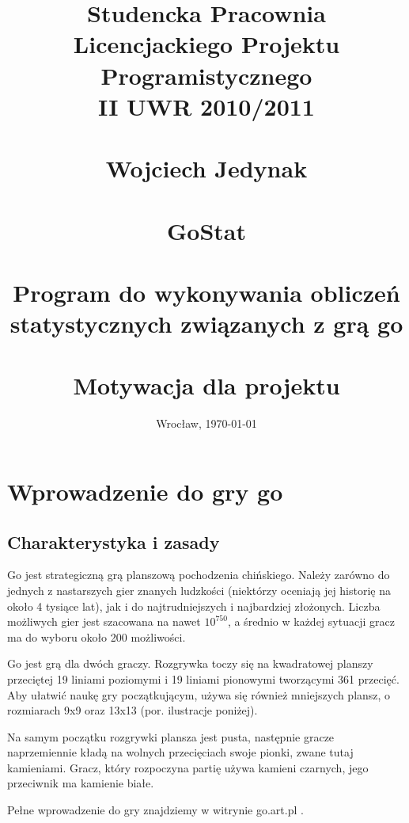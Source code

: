 \documentclass[11pt,leqno]{article}
\title{\normalsize \textbf{Studencka Pracownia Licencjackiego Projektu Programistycznego} \\
       \textbf{II UWR 2010/2011} \\ 
       \ \\
       \vspace{15em}
       \Large Wojciech Jedynak \\
       \normalsize \ \\
       \Huge GoStat \\
       \tiny \ \\
       \LARGE \textbf{Program do wykonywania obliczeń} \\
              \textbf{statystycznych związanych z grą go} \\ 
       \ \\
       \Large Motywacja dla projektu \\
       \vspace{15em}
       }
\date{Wrocław, \today}
\begin{document}
\maketitle 
\thispagestyle{empty}

\newpage

\tableofcontents

\newpage


\section{Wprowadzenie do gry go}

\subsection{Charakterystyka i zasady}

Go jest strategiczną grą planszową pochodzenia chińskiego. Należy zarówno do jednych z nastarszych gier znanych 
ludzkości (niektórzy oceniają jej historię na około 4 tysiące lat), jak i do najtrudniejszych i najbardziej złożonych.
Liczba możliwych gier jest szacowana na nawet $ 10^{750} $, a średnio w każdej sytuacji gracz ma do wyboru około 200 możliwości.

Go jest grą dla dwóch graczy. Rozgrywka toczy się na kwadratowej planszy przeciętej 19 liniami poziomymi i 19 liniami pionowymi 
tworzącymi 361 przecięć. Aby ułatwić naukę gry  początkującym, używa się również mniejszych plansz, 
o rozmiarach 9x9 oraz 13x13 (por. ilustracje poniżej).

Na samym początku rozgrywki plansza jest pusta, następnie gracze naprzemiennie kładą na wolnych przecięciach swoje pionki, 
zwane tutaj kamieniami. Gracz, który rozpoczyna partię używa kamieni czarnych, jego przeciwnik ma kamienie białe.

Pełne wprowadzenie do gry znajdziemy w witrynie go.art.pl \cite{rules}.
\end{document}
